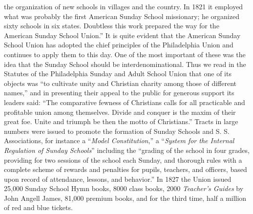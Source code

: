 the organization of new schools in villages and the country. In 1821 it employed what was probably the first American Sunday School missionary; he organized sixty schools in six states. Doubtless this work prepared the way for the American Sunday School Union.” It is quite evident that the American Sunday School Union has adopted the chief principles of the Philadelphia Union and continues to apply them to this day. One of the most important of these was the idea that the Sunday School should be interdenominational. Thus we read in the Statutes of the Philadelphia Sunday and Adult School Union that one of its objects was “to cultivate unity and Christian charity among those of different names,” and in presenting their appeal to the public for generous support its leaders said: “The comparative fewness of Christians calls for all practicable and profitable union among themselves. Divide and conquer is the maxim of their great foe. Unite and triumph be then the motto of Christians.” Tracts in large numbers were issued to promote the formation of Sunday Schools and S. S. Associations, for instance a “\emph{Model Constitution},” a “\emph{System for the Internal Regulation of Sunday Schools}” including the “grading of the school in four grades, providing for two sessions of the school each Sunday, and thorough rules with a complete scheme of rewards and penalties for pupils, teachers, and officers, based upon record of attendance, lessons, and behavior.” In 1827 the Union issued 25,000 Sunday School Hymn books, 8000 class books, 2000 \emph{Teacher’s Guides} by John Angell James, 81,000 premium books, and for the third time, half a million of red and blue tickets.

